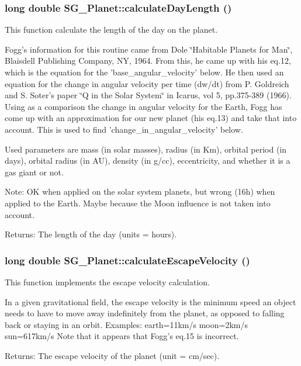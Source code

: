 \subsubsection{\setlength{\rightskip}{0pt plus 5cm}long double SG\_\-Planet::calculate\-Day\-Length ()\hspace{0.3cm}{\tt  [protected]}}\label{class_s_g___planet_b7}


This function calculate the length of the day on the planet. 

Fogg's information for this routine came from Dole \char`\"{}Habitable Planets for Man\char`\"{}, Blaisdell Publishing Company, NY, 1964. From this, he came up with his eq.12, which is the equation for the 'base\_\-angular\_\-velocity' below. He then used an equation for the change in angular velocity per time (dw/dt) from P. Goldreich and S. Soter's paper \char`\"{}Q in the Solar System\char`\"{} in Icarus, vol 5, pp.375-389 (1966). Using as a comparison the change in angular velocity for the Earth, Fogg has come up with an approximation for our new planet (his eq.13) and take that into account. This is used to find 'change\_\-in\_\-angular\_\-velocity' below.

Used parameters are mass (in solar masses), radius (in Km), orbital period (in days), orbital radius (in AU), density (in g/cc), eccentricity, and whether it is a gas giant or not.

Note: OK when applied on the solar system planets, but wrong (16h) when applied to the Earth. Maybe because the Moon influence is not taken into account. \begin{Desc}
\item[Returns:]The length of the day (units = hours). \end{Desc}
\subsubsection{\setlength{\rightskip}{0pt plus 5cm}long double SG\_\-Planet::calculate\-Escape\-Velocity ()\hspace{0.3cm}{\tt  [protected]}}\label{class_s_g___planet_b25}


This function implements the escape velocity calculation. 

In a given gravitational field, the escape velocity is the minimum speed an object needs to have to move away indefinitely from the planet, as opposed to falling back or staying in an orbit. Examples: earth=11km/s moon=2km/s sun=617km/s Note that it appears that Fogg's eq.15 is incorrect. \begin{Desc}
\item[Returns:]The escape velocity of the planet (unit = cm/sec).\end{Desc}


